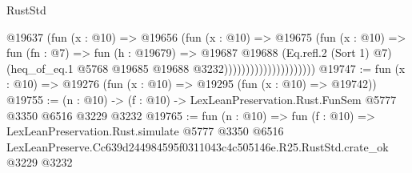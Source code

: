 \begin{lexlean}{RustStd}
\begin{coremodule}
                                    @19637
                                      (fun (x : @10) =>
                                      @19656
                                        (fun (x : @10) =>
                                        @19675
                                          (fun (x : @10) =>
                                          fun (fn : @7) =>
                                          fun (h : @19679) =>
                                          @19687
                                            @19688
                                            (Eq.refl.{2} (Sort 1) @7)
                                            (heq_of_eq.{1}
                                              @5768
                                              @19685
                                              @19688
                                              @3232)))))))))))))))))))))
@19747 := fun (x : @10) => @19276 (fun (x : @10) => @19295 (fun (x : @10) => @19742))
@19755 := (n : @10) -> (f : @10) -> LexLeanPreservation.Rust.FunSem @5777 @3350 @6516 @3229 @3232
@19765 := fun (n : @10) =>
  fun (f : @10) =>
  LexLeanPreservation.Rust.simulate
    @5777
    @3350
    @6516
    LexLeanPreserve.Cc639d244984595f0311043c4c505146e.R25.RustStd.crate_ok
    @3229
    @3232
\end{coremodule}
\end{lexlean}
